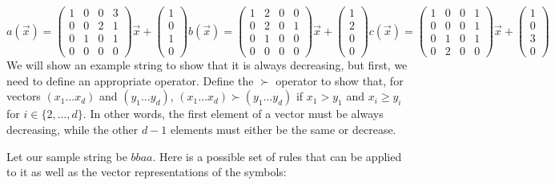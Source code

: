 \documentclass[12pt]{article}
\theoremstyle{definition}
\begin{document}
\[
a(\Vec{x}) = \begin{pmatrix}
1&0&0&3\\
0&0&2&1\\
0&1&0&1\\
0&0&0&0
\end{pmatrix} \Vec{x} + \begin{pmatrix}
1\\
0\\
1\\
0
\end{pmatrix}
b(\Vec{x}) = \begin{pmatrix}
1&2&0&0\\
0&2&0&1\\
0&1&0&0\\
0&0&0&0
\end{pmatrix} \Vec{x} + \begin{pmatrix}
1\\
2\\
0\\
0
\end{pmatrix}
c(\Vec{x}) = \begin{pmatrix}
1&0&0&1\\
0&0&0&1\\
0&1&0&1\\
0&2&0&0
\end{pmatrix} \Vec{x} + \begin{pmatrix}
1\\
0\\
3\\
0
\end{pmatrix}
\]
We will show an example string to show that it is always decreasing, but first, we need to define an appropriate operator. Define the $\succ$ operator to show that, for vectors $(x_1 \ldots x_d)$ and $(y_1 \ldots y_d)$, $(x_1 \ldots x_d) \succ (y_1 \ldots y_d)$ if $x_1 > y_1$ and $x_i \geq y_i$ for $i \in \{2, \ldots, d\}$. In other words, the first element of a vector must be always decreasing, while the other $d-1$ elements must either be the same or decrease. \par
Let our sample string be $bbaa$. Here is a possible set of rules that can be applied to it as well as the vector representations of the symbols:
\end{document}
